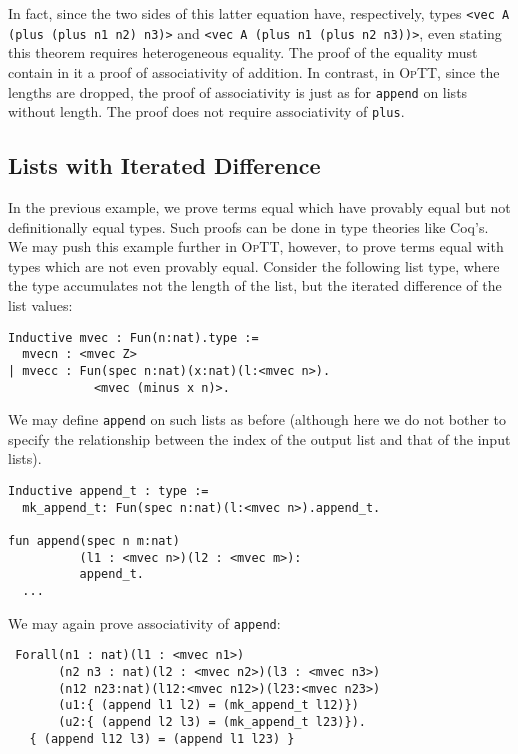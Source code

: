 \documentclass[preprint,natbib]{sigplanconf}
\newcommand{\optt}{\textsc{OpTT}}
\begin{document}
\noindent In fact, since the two sides of this latter equation have,
respectively, types \texttt{<vec A (plus (plus n1 n2) n3)>} and
\texttt{<vec A (plus n1 (plus n2 n3))>}, even stating this theorem
requires heterogeneous equality.  The proof of the equality must
contain in it a proof of associativity of addition.  In contrast,
in \optt, since the lengths are dropped, the proof of associativity
is just as for \texttt{append} on lists without length.  The proof
does not require associativity of \texttt{plus}.  

\subsection{Lists with Iterated Difference}
\label{sec:eg2}

In the previous example, we prove terms equal which have provably
equal but not definitionally equal types.  Such proofs can be done in
type theories like Coq's.  We may push this example further in \optt,
however, to prove terms equal with types which are not even provably
equal.  Consider the following list type, where the type accumulates
not the length of the list, but the iterated difference of the list
values:

\begin{verbatim}
Inductive mvec : Fun(n:nat).type :=
  mvecn : <mvec Z>
| mvecc : Fun(spec n:nat)(x:nat)(l:<mvec n>).
            <mvec (minus x n)>.
\end{verbatim}

\noindent We may define \texttt{append} on such lists as before
(although here we do not bother to specify the relationship between
the index of the output list and that of the input lists).

\begin{verbatim}
Inductive append_t : type :=
  mk_append_t: Fun(spec n:nat)(l:<mvec n>).append_t.

fun append(spec n m:nat)
          (l1 : <mvec n>)(l2 : <mvec m>):
          append_t.
  ...
\end{verbatim}

\noindent We may again prove associativity of \texttt{append}:

\begin{verbatim}
 Forall(n1 : nat)(l1 : <mvec n1>)
       (n2 n3 : nat)(l2 : <mvec n2>)(l3 : <mvec n3>)
       (n12 n23:nat)(l12:<mvec n12>)(l23:<mvec n23>)
       (u1:{ (append l1 l2) = (mk_append_t l12)})
       (u2:{ (append l2 l3) = (mk_append_t l23)}).
   { (append l12 l3) = (append l1 l23) } 
\end{verbatim}
\end{document}

